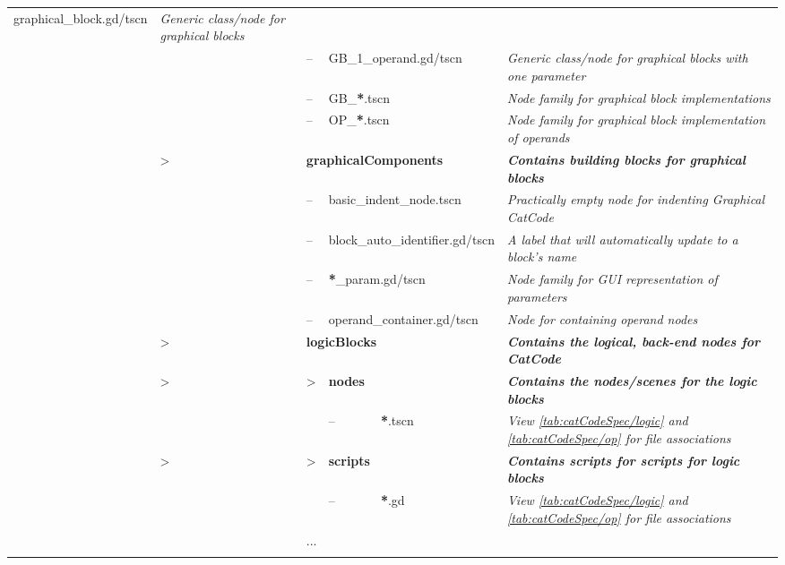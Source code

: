 \begin{fullwidthfigure}[H]
\begin{tabular}{|rllllp{11cm}|}
{            graphical\_block.gd/tscn
        }
        & \textit{Generic class/node for graphical blocks}
        \\
        & & -- & \multicolumn{2}{l}{
            GB\_1\_operand.gd/tscn
        }
        & \textit{Generic class/node for graphical blocks with one parameter}
        \\
        & & -- & \multicolumn{2}{l}{
            GB\_\textbf{*}.tscn
        }
        & \textit{Node family for graphical block implementations}
        \\
        & & -- & \multicolumn{2}{l}{
            OP\_\textbf{*}.tscn
        }
        & \textit{Node family for graphical block implementation of operands}
        \\
        & > & \multicolumn{3}{l}{
            \textbf{graphicalComponents} 
        }
        & \textit{\textbf{Contains building blocks for graphical blocks}}
        \\
        & & -- & \multicolumn{2}{l}{
            basic\_indent\_node.tscn
        }
        & \textit{Practically empty node for indenting Graphical CatCode}
        \\
        & & -- & \multicolumn{2}{l}{
            block\_auto\_identifier.gd/tscn
        }
        & \textit{A label that will automatically update to a block's name}
        \\
        & & -- & \multicolumn{2}{l}{
            \textbf{*}\_param.gd/tscn
        }
        & \textit{Node family for GUI representation of parameters}
        \\
        & & -- & \multicolumn{2}{l}{
            operand\_container.gd/tscn
        }
        & \textit{Node for containing operand nodes}
        \\
        & > & \multicolumn{3}{l}{
            \textbf{logicBlocks} 
        }
        & \textit{\textbf{Contains the logical, back-end nodes for CatCode}}
        \\
        & > & > & \multicolumn{2}{l}{
            \textbf{nodes} 
        }
        & \textit{\textbf{Contains the nodes/scenes for the logic blocks}}
        \\
        & & & -- & \multicolumn{1}{l}{
            \textbf{*}.tscn
        }
        & \textit{View \autoref{tab:catCodeSpec/logic} and \autoref{tab:catCodeSpec/op} for file associations}
        \\
        & > & > & \multicolumn{2}{l}{
            \textbf{scripts} 
        }
        & \textit{\textbf{Contains scripts for scripts for logic blocks}}
        \\
        & & & -- & \multicolumn{1}{l}{
            \textbf{*}.gd
        }
        & \textit{View \autoref{tab:catCodeSpec/logic} and \autoref{tab:catCodeSpec/op} for file associations}
        \\

        & & \multicolumn{3}{l}{...} &
        \\
        & & \multicolumn{3}{l}{} &
        \\
    \hline
    \end{tabular}
    \label{fig:catCodeSpec/files}
\end{fullwidthfigure}

